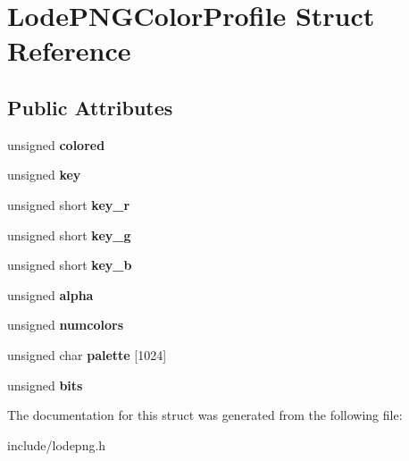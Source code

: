 \hypertarget{struct_lode_p_n_g_color_profile}{}\section{Lode\+P\+N\+G\+Color\+Profile Struct Reference}
\label{struct_lode_p_n_g_color_profile}
\subsection*{Public Attributes}
\begin{DoxyCompactItemize}
\item 
unsigned {\bfseries colored}\hypertarget{struct_lode_p_n_g_color_profile_abf063a566a4ab9f4d71b49764573d610}{}\label{struct_lode_p_n_g_color_profile_abf063a566a4ab9f4d71b49764573d610}

\item 
unsigned {\bfseries key}\hypertarget{struct_lode_p_n_g_color_profile_a24f19f400a53672340877eefbc837b0c}{}\label{struct_lode_p_n_g_color_profile_a24f19f400a53672340877eefbc837b0c}

\item 
unsigned short {\bfseries key\+\_\+r}\hypertarget{struct_lode_p_n_g_color_profile_a0398985ae0572ef97e83c33c7486cafd}{}\label{struct_lode_p_n_g_color_profile_a0398985ae0572ef97e83c33c7486cafd}

\item 
unsigned short {\bfseries key\+\_\+g}\hypertarget{struct_lode_p_n_g_color_profile_aba03e973374bd15315b8c01b86e94e8f}{}\label{struct_lode_p_n_g_color_profile_aba03e973374bd15315b8c01b86e94e8f}

\item 
unsigned short {\bfseries key\+\_\+b}\hypertarget{struct_lode_p_n_g_color_profile_a39b65ec69f6aaee3ee7312a993f21e40}{}\label{struct_lode_p_n_g_color_profile_a39b65ec69f6aaee3ee7312a993f21e40}

\item 
unsigned {\bfseries alpha}\hypertarget{struct_lode_p_n_g_color_profile_a554fea329af8034e91e1cdd8c1af0d90}{}\label{struct_lode_p_n_g_color_profile_a554fea329af8034e91e1cdd8c1af0d90}

\item 
unsigned {\bfseries numcolors}\hypertarget{struct_lode_p_n_g_color_profile_afdce0f5fbec46d6b8f1ec63da0a285f9}{}\label{struct_lode_p_n_g_color_profile_afdce0f5fbec46d6b8f1ec63da0a285f9}

\item 
unsigned char {\bfseries palette} \mbox{[}1024\mbox{]}\hypertarget{struct_lode_p_n_g_color_profile_a223f8bee4c9ae8be0b70cc08f19aaead}{}\label{struct_lode_p_n_g_color_profile_a223f8bee4c9ae8be0b70cc08f19aaead}

\item 
unsigned {\bfseries bits}\hypertarget{struct_lode_p_n_g_color_profile_a1d3870b03dfe6d699bf4c968c9bc1890}{}\label{struct_lode_p_n_g_color_profile_a1d3870b03dfe6d699bf4c968c9bc1890}

\end{DoxyCompactItemize}


The documentation for this struct was generated from the following file\+:\begin{DoxyCompactItemize}
\item 
include/lodepng.\+h\end{DoxyCompactItemize}
